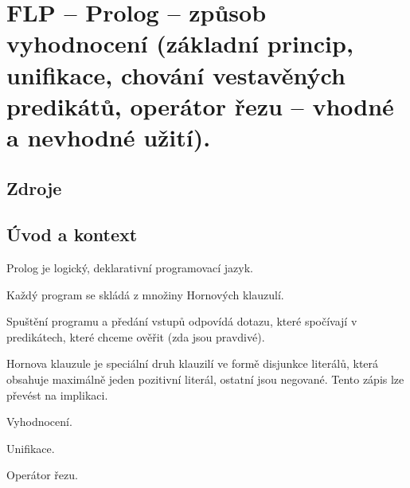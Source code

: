 

\graphicspath{{flp/prolog_zpusob_vyhodnoceni/figures}}


\chapter{FLP -- Prolog -- způsob vyhodnocení (základní princip, unifikace, chování vestavěných predikátů, operátor řezu -- vhodné a nevhodné užití).}


\section{Zdroje}

\begin{compactitem}
    \item {}
\end{compactitem}


\section{Úvod a kontext}

\begin{compactitem}
    \item Prolog je logický, deklarativní programovací jazyk.
    \item Každý program se skládá z množiny Hornových klauzulí.
    \item Spuštění programu a předání vstupů odpovídá dotazu, které spočívají v predikátech, které chceme ověřit (zda jsou pravdivé).
    \item Hornova klauzule je speciální druh klauzilí ve formě disjunkce literálů, která obsahuje maximálně jeden pozitivní literál, ostatní jsou negované. Tento zápis lze převést na implikaci.
    \item Vyhodnocení.
    \item Unifikace.
    \item Operátor řezu.
\end{compactitem}
